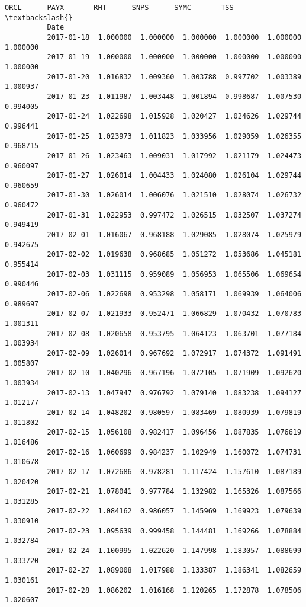 \documentclass[11pt]{article}
\begin{document}
\begin{Verbatim}[commandchars=\\\{\}]
                          ORCL      PAYX       RHT      SNPS      SYMC       TSS  \textbackslash{}
          Date                                                                     
          2017-01-18  1.000000  1.000000  1.000000  1.000000  1.000000  1.000000   
          2017-01-19  1.000000  1.000000  1.000000  1.000000  1.000000  1.000000   
          2017-01-20  1.016832  1.009360  1.003788  0.997702  1.003389  1.000937   
          2017-01-23  1.011987  1.003448  1.001894  0.998687  1.007530  0.994005   
          2017-01-24  1.022698  1.015928  1.020427  1.024626  1.029744  0.996441   
          2017-01-25  1.023973  1.011823  1.033956  1.029059  1.026355  0.968715   
          2017-01-26  1.023463  1.009031  1.017992  1.021179  1.024473  0.960097   
          2017-01-27  1.026014  1.004433  1.024080  1.026104  1.029744  0.960659   
          2017-01-30  1.026014  1.006076  1.021510  1.028074  1.026732  0.960472   
          2017-01-31  1.022953  0.997472  1.026515  1.032507  1.037274  0.949419   
          2017-02-01  1.016067  0.968188  1.029085  1.028074  1.025979  0.942675   
          2017-02-02  1.019638  0.968685  1.051272  1.053686  1.045181  0.955414   
          2017-02-03  1.031115  0.959089  1.056953  1.065506  1.069654  0.990446   
          2017-02-06  1.022698  0.953298  1.058171  1.069939  1.064006  0.989697   
          2017-02-07  1.021933  0.952471  1.066829  1.070432  1.070783  1.001311   
          2017-02-08  1.020658  0.953795  1.064123  1.063701  1.077184  1.003934   
          2017-02-09  1.026014  0.967692  1.072917  1.074372  1.091491  1.005807   
          2017-02-10  1.040296  0.967196  1.072105  1.071909  1.092620  1.003934   
          2017-02-13  1.047947  0.976792  1.079140  1.083238  1.094127  1.012177   
          2017-02-14  1.048202  0.980597  1.083469  1.080939  1.079819  1.011802   
          2017-02-15  1.056108  0.982417  1.096456  1.087835  1.076619  1.016486   
          2017-02-16  1.060699  0.984237  1.102949  1.160072  1.074731  1.010678   
          2017-02-17  1.072686  0.978281  1.117424  1.157610  1.087189  1.020420   
          2017-02-21  1.078041  0.977784  1.132982  1.165326  1.087566  1.031285   
          2017-02-22  1.084162  0.986057  1.145969  1.169923  1.079639  1.030910   
          2017-02-23  1.095639  0.999458  1.144481  1.169266  1.078884  1.032784   
          2017-02-24  1.100995  1.022620  1.147998  1.183057  1.088699  1.033720   
          2017-02-27  1.089008  1.017988  1.133387  1.186341  1.082659  1.030161   
          2017-02-28  1.086202  1.016168  1.120265  1.172878  1.078506  1.020607   

\end{Verbatim}
\end{document}
